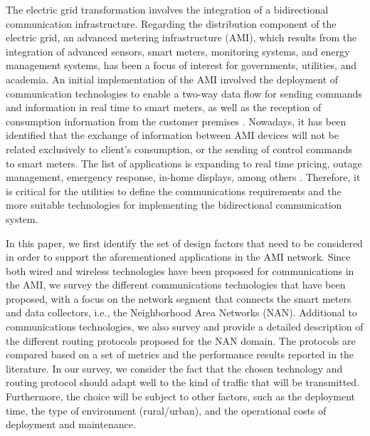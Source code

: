 \documentclass[10pt,twocolumn,twoside,submit]{JCNtran}
\begin{document}
 The electric grid transformation involves the integration of a bidirectional communication infrastructure. Regarding the distribution component of the electric grid, an advanced metering infrastructure (AMI), which results from the integration of advanced sensors, smart meters, monitoring systems, and energy management systems, has been a focus of interest for governments, utilities, and academia. An initial implementation of the AMI involved the deployment of communication technologies to enable a two-way data flow for sending commands and information in real time to smart meters, as well as the reception of consumption information from the customer premises \cite{Deconinck2008}. Nowadays, it has been identified that the exchange of information between AMI devices will not be related exclusively to client's consumption, or the sending of control commands to smart meters. The list of applications is expanding to real time pricing, outage management, emergency response, in-home displays, among others \cite{Rajalingham2013}. Therefore, it is critical for the utilities to define the communications requirements and the more suitable technologies for implementing the bidirectional communication system. 
 
In this paper, we first identify the set of design factors that need to be considered in order to support the aforementioned applications in the AMI network. Since both wired and wireless technologies have been proposed for communications in the AMI, we survey the different communications technologies that have been proposed, with a focus on the network segment that connects the smart meters and data collectors, i.e., the Neighborhood Area Networks (NAN). Additional to communications technologies, we also survey and provide a  detailed description of the different routing protocols proposed for the NAN domain. The protocols are compared based on a set of metrics and the performance results reported in the literature. In our survey, we consider the fact that the chosen technology and routing protocol should adapt well to the kind of traffic that will be transmitted. Furthermore, the choice will be subject to other factors, such as the deployment time, the type of environment (rural/urban), and the operational costs of deployment and maintenance.
\end{document}
